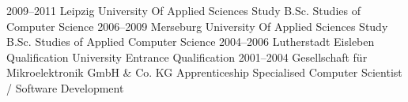 \documentclass[]{friggeri-cv}
\begin{document}
\begin{entrylist}
  \entry
    {2009–2011}
    {Leipzig University Of Applied Sciences}
    {Study B.Sc.}
    {Studies of Computer Science}
  \entry
    {2006–2009}
    {Merseburg University Of Applied Sciences}
    {Study B.Sc.}
    {Studies of Applied Computer Science}
  \entry
    {2004–2006}
    {Lutherstadt Eisleben}
    {Qualification}
    {University Entrance Qualification}
  \entry
    {2001–2004}
    {Gesellschaft für Mikroelektronik GmbH \& Co. KG}
    {Apprenticeship}
    {Specialised Computer Scientist / Software Development}
\end{entrylist}


%
\end{document}
